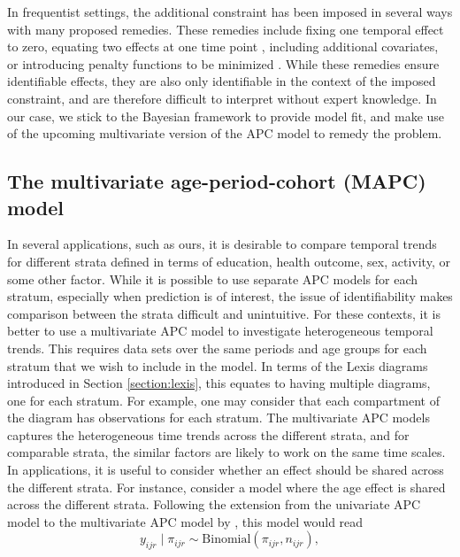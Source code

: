 In frequentist settings, the additional constraint has been imposed in several ways with many proposed remedies. These remedies include fixing one temporal effect to zero, equating two effects at one time point \citep{fienberg1979identification}, including additional covariates, or introducing penalty functions to be minimized \citep{osmond1982age}. While these remedies ensure identifiable effects, they are also only identifiable in the context of the imposed constraint, and are therefore difficult to interpret without expert knowledge. In our case, we stick to the Bayesian framework to provide model fit, and make use of the upcoming multivariate version of the APC model to remedy the problem. 

\subsection{The multivariate age-period-cohort (MAPC) model}
\label{section:multivariate}
In several applications, such as ours, it is desirable to compare temporal trends for different strata defined in terms of education, health outcome, sex, activity, or some other factor. While it is possible to use separate APC models for each stratum, especially when prediction is of interest, the issue of identifiability makes comparison between the strata difficult and unintuitive. For these contexts, it is better to use a multivariate APC model to investigate heterogeneous temporal trends. This requires data sets over the same periods and age groups for each stratum that we wish to include in the model. In terms of the Lexis diagrams introduced in Section \ref{section:lexis}, this equates to having multiple diagrams, one for each stratum. For example, one may consider that each compartment of the diagram has observations for each stratum. The multivariate APC models captures the heterogeneous time trends across the different strata, and for comparable strata, the similar factors are likely to work on the same time scales. In applications, it is useful to consider whether an effect should be shared across the different strata. For instance, consider a model where the age effect is shared across the different strata. Following the extension from the univariate APC model to the multivariate APC model by \cite{riebler2010multivariate}, this model would read
\begin{equation}
    y_{ijr}\mid \pi_{ijr} \sim \text{Binomial}(\pi_{ijr}, n_{ijr}),
    \label{eqn:likelihood-MAPC}
\end{equation}

